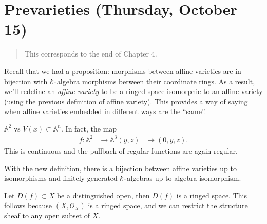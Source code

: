 \hypertarget{prevarieties-thursday-october-15}{%
\section{Prevarieties (Thursday, October
15)}\label{prevarieties-thursday-october-15}}

\begin{quote}
This corresponds to the end of Chapter 4.
\end{quote}

Recall that we had a proposition: morphisms between affine varieties are
in bijection with \(k{\hbox{-}}\)algebra morphisms between their
coordinate rings. As a result, we'll redefine an \emph{affine variety}
to be a ringed space isomorphic to an affine variety (using the previous
definition of affine variety). This provides a way of saying when affine
varieties embedded in different ways are the ``same''.

\begin{example}

\({\mathbb{A}}^2\) vs \(V(x) \subset {\mathbb{A}}^n\). In fact, the map
\begin{align*}  
f: {\mathbb{A}}^2 &\to {\mathbb{A}}^3
(y,z) &\mapsto (0, y, z)
.\end{align*}
This is continuous and the pullback of regular functions are again
regular.

\end{example}

\begin{remark}

With the new definition, there is a bijection between affine varieties
up to isomorphisms and finitely generated \(k{\hbox{-}}\)algebras up to
algebra isomorphism.

\end{remark}

\begin{proposition}

Let \(D(f) \subset X\) be a distinguished open, then \(D(f)\) is a
ringed space. This follows because \((X, {\mathcal{O}}_X)\) is a ringed
space, and we can restrict the structure sheaf to any open subset of
\(X\).

\end{proposition}

